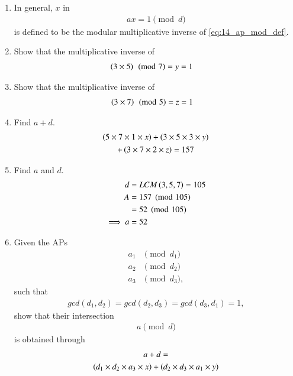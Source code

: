 \begin{enumerate}[label=\arabic*.,ref=\thesubsection.\theenumi]
\begin{enumerate}[label=\arabic*.,ref=\thesubsection.\theenumi]
\item In general, $x$ in 
\begin{align}
\label{eq:14_ap_mod_inv_def}
ax =1\pmod{d}
\end{align}
%
is defined to be the modular multiplicative inverse of \eqref{eq:14_ap_mod_def}.
\item Show that the multiplicative inverse of 
\begin{align}
\label{eq:14_ap_mod_357_sol}
\left(3\times 5\right)\pmod{7} &= y=1
\end{align}
%
\item Show that the multiplicative inverse of 
\begin{align}
\label{eq:14_ap_mod_375_sol}
\left(3\times 7\right)\pmod{5} &= z=1
\end{align}
%
\item Find $a+d$.
\\
\solution 
\begin{multline}
\label{eq:14_ap_mod_ad_sol}
\left(5\times 7 \times 1 \times x\right)+
\left(3\times 5\times 3 \times y\right) 
\\
+
\left(3\times 7\times 2 \times z\right) =  157
\end{multline}
%
\item Find $a$ and $d$.
\\
\solution
\begin{align}
\label{eq:14_ap_mod_d}
d &= LCM\left(3,5,7\right) = 105
\\
A&=157 \pmod{105} 
\nonumber \\
&= 52\pmod{105} 
\nonumber \\
\implies a &= 52
\end{align}
\item Given the APs 
\begin{align}
\label{eq:14_ap_mod_gen}
a_1&\pmod{d_1}
\\
a_2 &\pmod {d_2}
\\
a_3 &\pmod {d_3},
\end{align}
%
such that 
\begin{align}
gcd(d_1,d_2)=gcd(d_2,d_3)=gcd(d_3,d_1)=1,
\end{align}
show that their intersection
\begin{align}
\label{eq:14_ap_mod_gen_int}
a\pmod{d}
\end{align}
%
is obtained through
\begin{multline}
\label{eq:14_ap_mod_ad_gen}
a+d =
\\
 \brak{d_1\times d_2 \times a_3 \times x}+
\brak{d_2\times d_3 \times a_1 \times y}
\\

\end{multline}
\end{enumerate}
\end{enumerate}
